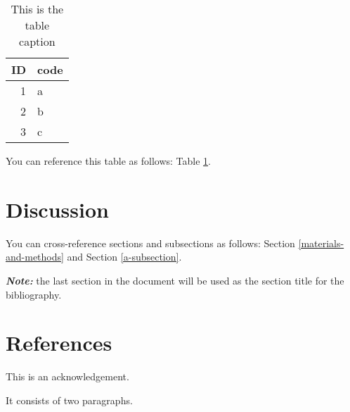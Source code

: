 \documentclass[12pt,halfline,a4paper,]{ouparticle}
\begin{document}
\begin{table}

\caption{\label{tab:tab2}This is the table caption}
\centering
\begin{tabular}[t]{rl}
\toprule
ID & code\\
\midrule
1 & a\\
2 & b\\
3 & c\\
\bottomrule
\end{tabular}
\end{table}

You can reference this table as follows: Table \ref{tab:tab2}.

\hypertarget{discussion}{%
\section{Discussion}\label{discussion}}

You can cross-reference sections and subsections as follows: Section \ref{materials-and-methods} and Section \ref{a-subsection}.

\textbf{\emph{Note:}} the last section in the document will be used as the section title for the bibliography.

\hypertarget{references}{%
\section{References}\label{references}}


\begin{notes}[Acknowledgements]
This is an acknowledgement.

It consists of two paragraphs.
\end{notes}
\end{document}
